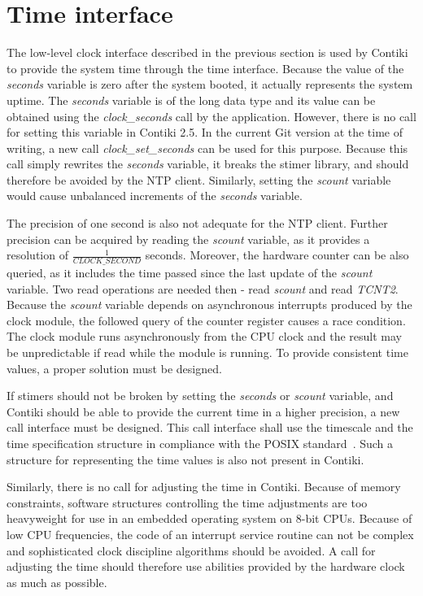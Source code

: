
\section{Time interface}\label{sec:analysis-time}
The low-level clock interface described in the previous section
is used by Contiki to provide the system time through the time interface.
Because the value of the {\it{seconds}} variable is zero after the system booted,
it actually represents the system uptime.
The {\it{seconds}} variable is of the long data type and its
value can be obtained using the {\it{clock\_seconds}} call by the application.
However, there is no call for setting this variable in Contiki 2.5.
In the current Git version at the time of writing, a new call {\it{clock\_set\_seconds}}
can be used for this purpose.
Because this call simply rewrites the {\it{seconds}} variable, it breaks the stimer library,
and should therefore be avoided by the NTP client.
Similarly, setting the {\it{scount}} variable would cause
unbalanced increments of the {\it{seconds}} variable.

The precision of one second is also not adequate for the NTP client.
Further precision can be acquired by reading the {\it{scount}} variable,
as it provides a resolution of $\frac{1}{CLOCK\_SECOND}$ seconds.
Moreover, the hardware counter can be also queried, as it includes the time passed since
the last update of the {\it{scount}} variable.
Two read operations are needed then - read {\it{scount}} and read {\it{TCNT2}}.
Because the {\it{scount}} variable depends on asynchronous interrupts produced by
the clock module, the followed query of the counter register causes a race condition.
The clock module runs asynchronously from the CPU clock and
the result may be unpredictable if read while the module is running.
To provide consistent time values, a proper solution must be designed.

If stimers should not be broken by setting the {\it{seconds}} or {\it{scount}} variable,
and Contiki should be able to provide the current time in a higher precision,
a new call interface must be designed.
This call interface shall use the timescale and the time specification structure in compliance
with the POSIX standard~\cite{posix}.
Such a structure for representing the time values is also not present in Contiki.

Similarly, there is no call for adjusting the time in Contiki.
Because of memory constraints, software structures controlling the time adjustments are too heavyweight
for use in an embedded operating system on 8-bit CPUs.
Because of low CPU frequencies, the code of an interrupt service routine can not be complex
and sophisticated clock discipline algorithms should be avoided.
A call for adjusting the time should therefore use abilities
provided by the hardware clock as much as possible.

